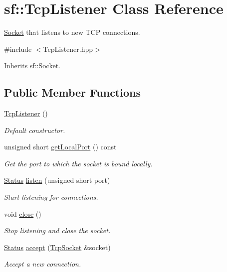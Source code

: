\hypertarget{classsf_1_1_tcp_listener}{\section{sf\+:\+:Tcp\+Listener Class Reference}
\label{classsf_1_1_tcp_listener}
}


\hyperlink{classsf_1_1_socket}{Socket} that listens to new T\+C\+P connections.  




{\ttfamily \#include $<$Tcp\+Listener.\+hpp$>$}



Inherits \hyperlink{classsf_1_1_socket}{sf\+::\+Socket}.

\subsection*{Public Member Functions}
\begin{DoxyCompactItemize}
\item 
\hypertarget{classsf_1_1_tcp_listener_a59a1db5b6f4711a3e57390da2f8d9630}{\hyperlink{classsf_1_1_tcp_listener_a59a1db5b6f4711a3e57390da2f8d9630}{Tcp\+Listener} ()}\label{classsf_1_1_tcp_listener_a59a1db5b6f4711a3e57390da2f8d9630}

\begin{DoxyCompactList}\small\item\em Default constructor. \end{DoxyCompactList}\item 
unsigned short \hyperlink{classsf_1_1_tcp_listener_a3bb62b92684cd1a14b14efdaf0471440}{get\+Local\+Port} () const 
\begin{DoxyCompactList}\small\item\em Get the port to which the socket is bound locally. \end{DoxyCompactList}\item 
\hyperlink{classsf_1_1_socket_a51bf0fd51057b98a10fbb866246176dc}{Status} \hyperlink{classsf_1_1_tcp_listener_a409d9350d3abfea9636df8cf4a61004e}{listen} (unsigned short port)
\begin{DoxyCompactList}\small\item\em Start listening for connections. \end{DoxyCompactList}\item 
void \hyperlink{classsf_1_1_tcp_listener_a3a00a850506bd0f9f48867a0fe59556b}{close} ()
\begin{DoxyCompactList}\small\item\em Stop listening and close the socket. \end{DoxyCompactList}\item 
\hyperlink{classsf_1_1_socket_a51bf0fd51057b98a10fbb866246176dc}{Status} \hyperlink{classsf_1_1_tcp_listener_ae2c83ce5a64d50b68180c46bef0a7346}{accept} (\hyperlink{classsf_1_1_tcp_socket}{Tcp\+Socket} \&socket)
\begin{DoxyCompactList}\small\item\em Accept a new connection. \end{DoxyCompactList}\end{DoxyCompactItemize}
